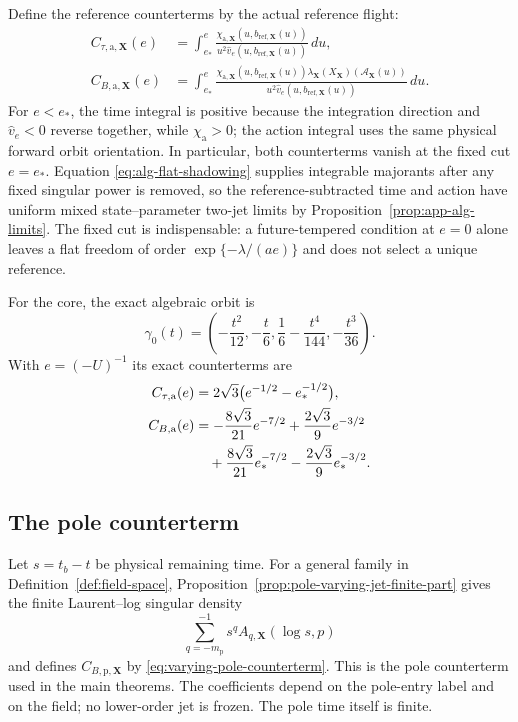 \documentclass[11pt]{amsart}
\numberwithin{equation}{section}
\theoremstyle{definition}
\theoremstyle{remark}
\begin{document}
Define the reference counterterms by the actual reference flight:
\begin{align}
 C_{\tau,\mathrm a,\mathbf X}(e)
 &=\int_{e_*}^{e}
   \frac{\chi_{\mathrm a,\mathbf X}
     (u,b_{\mathrm{ref},\mathbf X}(u))}
   {u^2\widehat v_e(u,b_{\mathrm{ref},\mathbf X}(u))}\,du,
 \label{eq:alg-time-counterterm}\\
 C_{B,\mathrm a,\mathbf X}(e)
 &=\int_{e_*}^{e}
 \frac{\chi_{\mathrm a,\mathbf X}
       (u,b_{\mathrm{ref},\mathbf X}(u))
       \lambda_{\mathbf X}(X_{\mathbf X})
       (\mathcal A_{\mathbf X}(u))}
 {u^2\widehat v_e(u,b_{\mathrm{ref},\mathbf X}(u))}\,du.
 \label{eq:alg-general-counterterms}
\end{align}
For $e<e_*$, the time integral is positive because the integration
direction and $\widehat v_e<0$ reverse together, while
$\chi_{\mathrm a}>0$; the action integral uses the same physical forward
orbit orientation.  In particular, both counterterms vanish at the fixed
cut $e=e_*$.
Equation \eqref{eq:alg-flat-shadowing} supplies integrable majorants after
any fixed singular power is removed, so the reference-subtracted time and
action have uniform mixed state--parameter two-jet limits by
Proposition~\ref{prop:app-alg-limits}.  The fixed cut is indispensable: a
future-tempered condition at $e=0$ alone leaves a flat freedom of order
$\exp\{-\lambda/(ae)\}$ and does not select a unique reference.

For the core, the exact algebraic orbit is
\begin{equation}\label{eq:exact-algebraic-orbit}
 \gamma_0(t)=\left(-\frac{t^2}{12},-\frac t6,
       \frac16-\frac{t^4}{144},-\frac{t^3}{36}\right).
\end{equation}
With $e=(-U)^{-1}$ its exact counterterms are
\begin{align}
 C_{\tau,\mathrm a}(e)
 &=2\sqrt3\bigl(e^{-1/2}-e_*^{-1/2}\bigr),
 \label{eq:core-alg-counterterms}\\
 C_{B,\mathrm a}(e)
 &=-\frac{8\sqrt3}{21}e^{-7/2}
 +\frac{2\sqrt3}{9}e^{-3/2}\notag\\
 &\quad+\frac{8\sqrt3}{21}e_*^{-7/2}
 -\frac{2\sqrt3}{9}e_*^{-3/2}.\notag
\end{align}

\subsection{The pole counterterm}

Let $s=t_b-t$ be physical remaining time.  For a general family in
Definition~\ref{def:field-space},
Proposition~\ref{prop:pole-varying-jet-finite-part} gives the finite
Laurent--log singular density
\[
 \sum_{q=-m_{\mathrm p}}^{-1}s^qA_{q,\mathbf X}(\log s,p)
\]
and defines $C_{B,\mathrm p,\mathbf X}$ by
\eqref{eq:varying-pole-counterterm}.  This is the pole counterterm used in
the main theorems.  The coefficients depend on the pole-entry label and
on the field; no lower-order jet is frozen.  The pole time itself is
finite.
\end{document}
